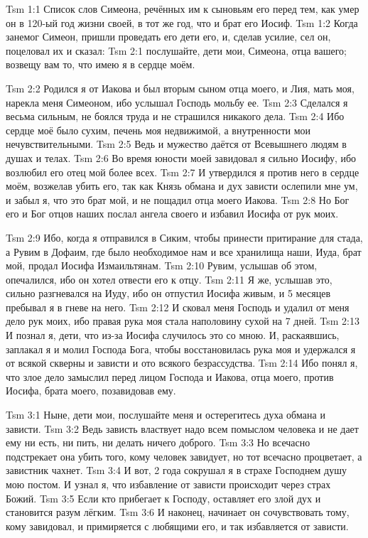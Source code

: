 \vs Tsm 1:1
Список слов Симеона, речённых им к сыновьям его перед тем,
как умер он в 120-ый год жизни своей,
в тот же год, что и брат его Иосиф.
\vs Tsm 1:2
Когда занемог Симеон, пришли проведать его дети его, и, сделав
усилие, сел он, поцеловал их и сказал:
\vs Tsm 2:1
послушайте, дети мои, Симеона, отца вашего; возвещу вам то,
что имею я в сердце моём.

\vs Tsm 2:2
Родился я от Иакова и был вторым сыном отца моего, и Лия, мать моя,
нарекла меня Симеоном, ибо услышал Господь мольбу ее.
\vs Tsm 2:3
Сделался я весьма сильным, не боялся труда и не страшился никакого дела.
\vs Tsm 2:4
Ибо сердце моё было сухим, печень моя недвижимой,
а внутренности мои нечувствительными.
\vs Tsm 2:5
Ведь и мужество даётся от Всевышнего людям в душах и телах.
\vs Tsm 2:6
Во время юности моей завидовал я сильно Иосифу,
ибо возлюбил его отец мой более всех.
\vs Tsm 2:7
И утвердился я против него в сердце моём, возжелав убить его,
так как Князь обмана и дух зависти ослепили мне ум, и забыл я,
что это брат мой, и не пощадил отца моего Иакова.
\vs Tsm 2:8
Но Бог его и Бог отцов наших послал ангела своего и избавил
Иосифа от рук моих.

\vs Tsm 2:9
Ибо, когда я отправился в Сиким, чтобы принести притирание для стада,
а Рувим  в Дофаим, где было необходимое нам и все хранилища наши,
Иуда, брат мой, продал Иосифа Измаильтянам.
\vs Tsm 2:10
Рувим, услышав об этом, опечалился, ибо он хотел отвести его к отцу.
\vs Tsm 2:11
Я же, услышав это, сильно разгневался на Иуду,
ибо он отпустил Иосифа живым,
и 5 месяцев пребывал я в гневе на него.
\vs Tsm 2:12
И сковал меня Господь и удалил от меня дело рук моих,
ибо правая рука моя стала наполовину сухой на 7 дней.
\vs Tsm 2:13
И познал я, дети, что из-за Иосифа случилось это со мною.
И, раскаявшись, заплакал я и молил Господа Бога,
чтобы восстановилась рука моя и удержался я от всякой скверны
и зависти и ото всякого безрассудства.
\vs Tsm 2:14
Ибо понял я, что злое дело замыслил перед лицом Господа и Иакова,
отца моего, против Иосифа, брата моего, позавидовав ему.

\vs Tsm 3:1
Ныне, дети мои, послушайте меня и остерегитесь духа обмана и зависти.
\vs Tsm 3:2
Ведь зависть властвует надо всем помыслом человека
и не дает ему ни есть, ни пить, ни делать ничего доброго.
\vs Tsm 3:3
Но всечасно подстрекает она убить того, кому человек завидует,
но тот всечасно процветает, а завистник чахнет.
\vs Tsm 3:4
И вот, 2 года сокрушал я в страхе Господнем душу мою постом.
И узнал я, что избавление от зависти происходит через страх Божий.
\vs Tsm 3:5
Если кто прибегает к Господу, оставляет его злой дух
и становится разум лёгким.
\vs Tsm 3:6
И наконец, начинает он сочувствовать тому, кому завидовал, и
примиряется с любящими его, и так избавляется от зависти.

